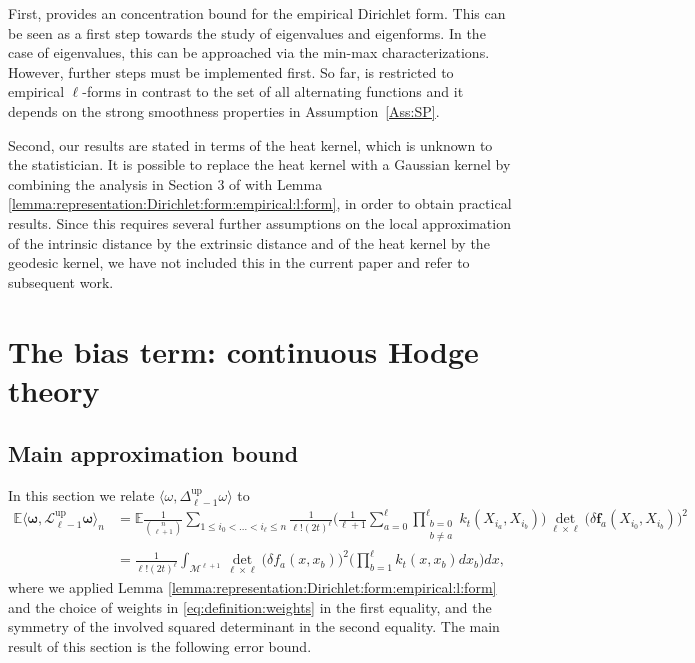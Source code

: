 \documentclass[10pt]{article}
\DeclareMathOperator{\up}{up}
\theoremstyle{plain}
\theoremstyle{definition}
\theoremstyle{remark}
\begin{document}
First,  provides an concentration bound for the empirical Dirichlet form. This can be seen as a first step towards the study of eigenvalues and eigenforms. In the case of eigenvalues, this can be approached via the min-max characterizations. However, further steps must be implemented first. So far,  is restricted to empirical $\ell$-forms in contrast to the set of all alternating functions and it depends on the strong smoothness properties in Assumption~\ref{Ass:SP}. 

Second, our results are stated in terms of the heat kernel, which is unknown to the statistician. It is possible to replace the heat kernel with a Gaussian kernel by combining the analysis in Section 3 of \cite{Wahl24} with Lemma \ref{lemma:representation:Dirichlet:form:empirical:l:form}, in order to obtain practical results. Since this requires several further assumptions on the local approximation of the intrinsic distance by the extrinsic distance and of the heat kernel by the geodesic kernel, we have not included this in the current paper and refer to subsequent work.





\section{The bias term: continuous Hodge theory}\label{section:bias}

\subsection{Main approximation bound}

In this section we relate $\langle\omega,\Delta_{\ell-1}^{\up}\omega\rangle$ to
\begin{align*}
    \mathbb{E} \langle\boldsymbol{\omega},\mathscr{L}_{\ell-1}^{\up}\boldsymbol{\omega}\rangle_n
    & =\mathbb{E}\frac{1}{\binom{n}{\ell+1}}\sum_{1\leq i_0<\dots<i_\ell\leq n}\frac{1}{\ell !(2t)^\ell}\Big(\frac{1}{\ell+1}\sum_{a=0}^\ell\prod_{\substack{b=0\\b\neq a}}^\ell k_t(X_{i_a},X_{i_b})\Big)\det_{\ell\times\ell}\big( \delta\mathbf{f}_a(X_{i_0},X_{i_b})\big)^2\\
    &=\frac{1}{\ell!(2t)^\ell}\int_{\mathcal{M}^{\ell+1}}\det_{\ell\times\ell}\big( \delta f_a(x,x_b)\big)^2\Big(\prod_{b=1}^\ell k_t(x,x_b)dx_b\Big)dx,
\end{align*}
where we applied Lemma \ref{lemma:representation:Dirichlet:form:empirical:l:form} and the choice of weights in \eqref{eq:definition:weights} in the first equality, and the symmetry of the involved squared determinant in the second equality. The main result of this section is the following error bound.
\end{document}
